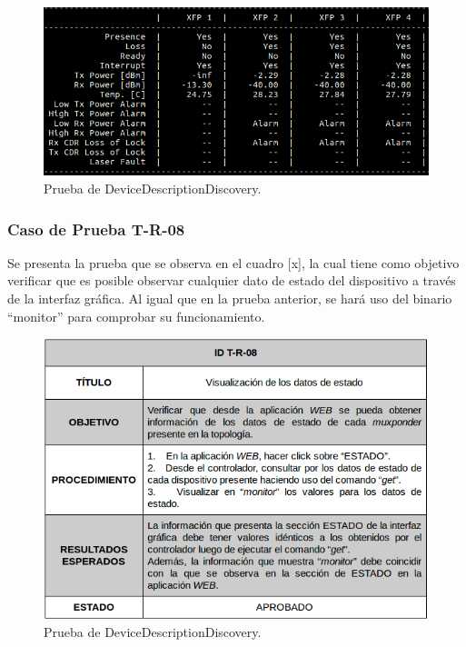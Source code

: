   \begin{figure}[H]
	\centering
	\includegraphics[scale=0.5]{Figures/test7_3.png}
	\caption{Prueba de DeviceDescriptionDiscovery.}
	\label{fig:test2}
  \end{figure}

  \subsubsection{Caso de Prueba T-R-08}

  Se presenta la prueba que se observa en el cuadro [x], la cual tiene como objetivo verificar que es posible observar cualquier dato de estado del dispositivo a través de la interfaz gráfica. Al igual que en la prueba anterior, se hará uso del binario “monitor” para comprobar su funcionamiento.
  
  
  \begin{figure}[H]
      \centering
      \includegraphics[scale=0.6]{Figures/test8.png}
      \caption{Prueba de DeviceDescriptionDiscovery.}
      \label{fig:test2}
    \end{figure}

